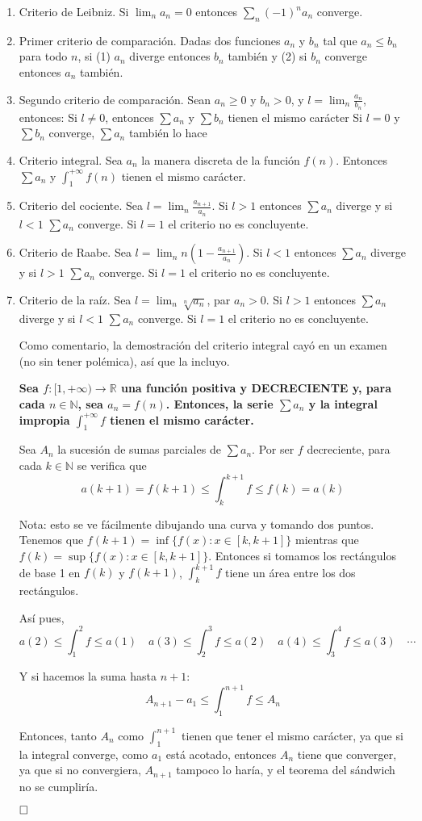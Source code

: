 \documentclass[a4paper]{article}
\newcommand{\qed}{\begin{flushright}
		{$\newline\square$}
	\end{flushright}}
\begin{document}
\begin{enumerate}
	\item Criterio de Leibniz. Si $\lim_n a_n = 0$ entonces $\sum_n (-1)^n a_n$ converge.
	\item Primer criterio de comparación. Dadas dos funciones $a_n$ y $b_n$ tal que $a_n \le b_n$ para todo $n$, si (1) $a_n$ diverge entonces $b_n$ también y (2) si $b_n$ converge entonces $a_n$ también.
	\item Segundo criterio de comparación. Sean $a_n \ge 0 $ y $b_n > 0$, y $l = \lim_n \frac{a_n}{b_n}$, entonces:
		\subitem Si $l\neq0$, entonces $\sum a_n$ y $\sum b_n$ tienen el mismo carácter
		\subitem Si $l = 0$ y $\sum b_n$ converge, $\sum a_n$ también lo hace
	\item Criterio integral. Sea $a_n$ la manera discreta de la función $f(n)$. Entonces $\sum a_n$ y $\int^{+\infty}_1f(n)$ tienen el mismo carácter.
	\item Criterio del cociente. Sea $l = \lim_n \frac{a_{n+1}}{a_n}$. Si $l>1$ entonces $\sum a_n$ diverge y si $l<1$ $\sum a_n$ converge. Si $l=1$ el criterio no es concluyente.
	\item Criterio de Raabe. Sea $l = \lim_n n(1-\frac{a_{n+1}}{a_n})$. Si $l<1$ entonces $\sum a_n$ diverge y si $l>1$ $\sum a_n$ converge. Si $l=1$ el criterio no es concluyente.
	\item Criterio de la raíz. Sea $l = \lim_n \sqrt[n]{a_n}$, par $a_n>0$. Si $l>1$ entonces $\sum a_n$ diverge y si $l<1$ $\sum a_n$ converge. Si $l=1$ el criterio no es concluyente.
	
	
	Como comentario, la demostración del criterio integral cayó en un examen (no sin tener polémica), así que la incluyo.
	
	\textbf{Sea $f:[1,+\infty) \rightarrow \mathbb{R}$ una función positiva y DECRECIENTE y, para cada $n\in \mathbb{N}$, sea $a_n=f(n)$. Entonces, la serie $\sum a_n$ y la integral impropia $\int_1^{+\infty} f$ tienen el mismo carácter.}
	
	Sea $A_n$ la sucesión de sumas parciales de $\sum a_n$. Por ser $f$ decreciente, para cada $k\in \mathbb{N}$ se verifica que 
	$$a(k+1) = f(k+1) \le \int_k^{k+1}f\le f(k) = a(k)$$
	
	Nota: esto se ve fácilmente dibujando una curva y tomando dos puntos. Tenemos que $f(k+1) = \inf\{f(x):x \in [k, k+1] \}$ mientras que $f(k) = \sup\{f(x):x \in [k, k+1] \}$. Entonces si tomamos los rectángulos de base 1 en $f(k)$ y $f(k+1)$, $\int_k^{k+1}f$ tiene un área entre los dos rectángulos.
	
	Así pues, 
	$$a(2) \le \int_1^{2}f\le a(1) \quad a(3) \le \int_2^{3}f\le a(2) \quad a(4) \le \int_3^{4}f\le a(3) \quad \cdots$$
	
	Y si hacemos la suma hasta $n+1$:
    $$A_{n+1}-a_1 \le \int_1^{n+1}f \le A_n$$
    
    Entonces, tanto $A_n$ como $\int_1^{n+1}$ tienen que tener el mismo carácter, ya que si la integral converge, como $a_1$ está acotado, entonces $A_n$ tiene que converger, ya que si no convergiera, $A_{n+1}$ tampoco lo haría, y el teorema del sándwich no se cumpliría.\qed
	
		

\end{enumerate}
\end{document}
